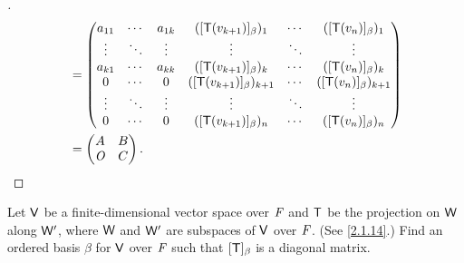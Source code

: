 \begin{proof}[]
\begin{align*}
		             & = \begin{pmatrix}
			                 a_{1 1} & \cdots & a_{1 k} & ([\mathsf{T}(v_{k + 1})]_{\beta})_1       & \cdots & ([\mathsf{T}(v_n)]_{\beta})_1       \\
			                 \vdots  & \ddots & \vdots  & \vdots                            & \ddots & \vdots                      \\
			                 a_{k 1} & \cdots & a_{k k} & ([\mathsf{T}(v_{k + 1})]_{\beta})_k       & \cdots & ([\mathsf{T}(v_n)]_{\beta})_k       \\
			                 0       & \cdots & 0       & ([\mathsf{T}(v_{k + 1})]_{\beta})_{k + 1} & \cdots & ([\mathsf{T}(v_n)]_{\beta})_{k + 1} \\
			                 \vdots  & \ddots & \vdots  & \vdots                            & \ddots & \vdots                      \\
			                 0       & \cdots & 0       & ([\mathsf{T}(v_{k + 1})]_{\beta})_{n}     & \cdots & ([\mathsf{T}(v_n)]_{\beta})_{n}
		                 \end{pmatrix} \\
		             & = \begin{pmatrix}
			                 A   & B \\
			                 \mathit{O} & C
		                 \end{pmatrix}.
	\end{align*}
\end{proof}

\begin{ex}\label{ex:2.2.12}
	Let \(\mathsf{V}\) be a finite-dimensional vector space over \(\mathit{F}\) and \(\mathsf{T}\) be the projection on \(\mathsf{W}\) along \(\mathsf{W}'\), where \(\mathsf{W}\) and \(\mathsf{W}'\) are subspaces of \(\mathsf{V}\) over \(\mathit{F}\).
	(See \cref{2.1.14}.)
	Find an ordered basis \(\beta\) for \(\mathsf{V}\) over \(\mathit{F}\) such that \([\mathsf{T}]_{\beta}\) is a diagonal matrix.
\end{ex}


